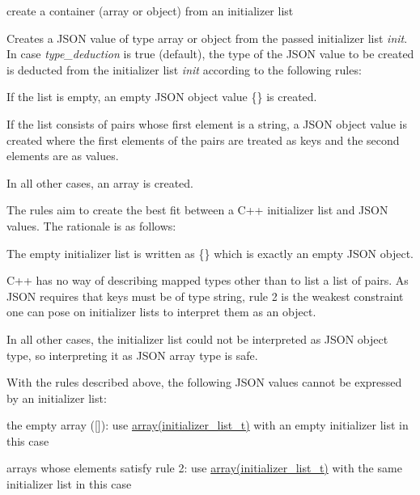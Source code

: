 create a container (array or object) from an initializer list 

Creates a J\+S\+ON value of type array or object from the passed initializer list {\itshape init}. In case {\itshape type\+\_\+deduction} is {\ttfamily true} (default), the type of the J\+S\+ON value to be created is deducted from the initializer list {\itshape init} according to the following rules\+:


\begin{DoxyEnumerate}
\item If the list is empty, an empty J\+S\+ON object value {\ttfamily \{\}} is created.
\item If the list consists of pairs whose first element is a string, a J\+S\+ON object value is created where the first elements of the pairs are treated as keys and the second elements are as values.
\item In all other cases, an array is created.
\end{DoxyEnumerate}

The rules aim to create the best fit between a C++ initializer list and J\+S\+ON values. The rationale is as follows\+:


\begin{DoxyEnumerate}
\item The empty initializer list is written as {\ttfamily \{\}} which is exactly an empty J\+S\+ON object.
\item C++ has no way of describing mapped types other than to list a list of pairs. As J\+S\+ON requires that keys must be of type string, rule 2 is the weakest constraint one can pose on initializer lists to interpret them as an object.
\item In all other cases, the initializer list could not be interpreted as J\+S\+ON object type, so interpreting it as J\+S\+ON array type is safe.
\end{DoxyEnumerate}

With the rules described above, the following J\+S\+ON values cannot be expressed by an initializer list\+:


\begin{DoxyItemize}
\item the empty array ({\ttfamily \mbox{[}\mbox{]}})\+: use \hyperlink{classnlohmann_1_1basic__json_aa80485befaffcadaa39965494e0b4d2e}{array(initializer\+\_\+list\+\_\+t)} with an empty initializer list in this case
\item arrays whose elements satisfy rule 2\+: use \hyperlink{classnlohmann_1_1basic__json_aa80485befaffcadaa39965494e0b4d2e}{array(initializer\+\_\+list\+\_\+t)} with the same initializer list in this case
\end{DoxyItemize}

